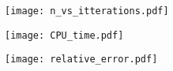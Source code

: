 \begin{figure}[htbp]
	\centering
	\texttt{[image: n\_vs\_itterations.pdf]}
	\caption{}
	\label{fig:n_vs_it}
\end{figure}

\begin{figure}[htbp]
	\centering
	\texttt{[image: CPU\_time.pdf]}
	\caption{}
	\label{fig:CPUtime}
\end{figure}

\begin{figure}[htbp]
	\centering
	\texttt{[image: relative\_error.pdf]}
	\caption{}
	\label{fig:error}
\end{figure}

